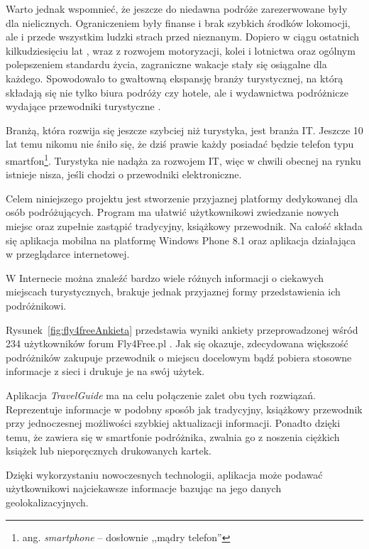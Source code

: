 \documentclass[a4paper]{book}
\newcommand{\appName}{\emph{TravelGuide} }
\begin{document}
			Warto jednak wspomnieć, że jeszcze do niedawna podróże zarezerwowane były dla nielicznych. Ograniczeniem były  finanse i brak szybkich środków lokomocji, ale i przede wszystkim  ludzki strach przed nieznanym. Dopiero w ciągu ostatnich kilkudziesięciu lat , wraz z rozwojem motoryzacji, kolei i lotnictwa oraz ogólnym polepszeniem standardu życia, zagraniczne wakacje stały się osiągalne dla każdego. Spowodowało to gwałtowną ekspansję branży turystycznej, na którą składają się nie tylko biura podróży czy hotele, ale i wydawnictwa podróżnicze wydające przewodniki turystyczne . 
			
			Branżą, która rozwija się jeszcze szybciej niż turystyka, jest branża IT. Jeszcze 10 lat temu nikomu nie śniło się, że dziś prawie każdy posiadać będzie telefon typu smartfon\footnote{ang. \emph{smartphone} -- dosłownie ,,mądry telefon''}. Turystyka nie nadąża za rozwojem IT, więc w chwili obecnej na rynku istnieje nisza, jeśli chodzi o przewodniki elektroniczne.
			
			Celem niniejszego projektu jest stworzenie przyjaznej platformy \ksremark{\appName} dedykowanej dla osób podróżujących. Program ma ułatwić użytkownikowi zwiedzanie nowych miejsc oraz zupełnie zastąpić tradycyjny, książkowy przewodnik. Na całość składa się aplikacja mobilna na platformę Windows Phone 8.1 oraz aplikacja działająca w przeglądarce internetowej. 
			
			W Internecie można znaleźć bardzo wiele różnych informacji o ciekawych miejscach turystycznych, brakuje jednak przyjaznej formy przedstawienia ich podróżnikowi. 
			
			Rysunek~\ref{fig:fly4freeAnkieta} przedstawia wyniki ankiety przeprowadzonej wśród 234 użytkowników forum Fly4Free.pl \cite{id:fly4free}. Jak się okazuje, zdecydowana większość podróżników zakupuje przewodnik o miejscu docelowym bądź pobiera stosowne informacje z sieci i drukuje je na swój użytek.
			
			Aplikacja \appName ma na celu połączenie zalet obu tych rozwiązań. Reprezentuje informacje w podobny sposób jak tradycyjny, książkowy przewodnik przy jednoczesnej możliwości szybkiej aktualizacji informacji. Ponadto dzięki temu, że zawiera się w smartfonie podróżnika, zwalnia go z noszenia ciężkich książek lub nieporęcznych drukowanych kartek. 
			
			Dzięki wykorzystaniu nowoczesnych technologii, aplikacja może podawać użytkownikowi najciekawsze informacje bazując na jego danych geolokalizacyjnych.  
			
\end{document}
